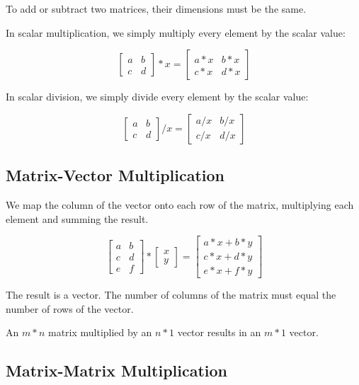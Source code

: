 \documentclass[UTF8]{article}
\begin{document}
To add or subtract two matrices, their dimensions must be the same.

In scalar multiplication, we simply multiply every element by the scalar value:

\[ \begin{bmatrix} a&b\\c&d \end{bmatrix} * x = \begin{bmatrix} a*x&b*x\\c*x&d*x \end{bmatrix}\]

In scalar division, we simply divide every element by the scalar value:

\[ \begin{bmatrix} a&b\\c&d \end{bmatrix} / x = \begin{bmatrix} a/x&b/x\\c/x&d/x \end{bmatrix}\]

\subsection{Matrix-Vector Multiplication}

We map the column of the vector onto each row of the matrix, multiplying each element and summing the result.

\[ \begin{bmatrix} a&b\\c&d\\e&f \end{bmatrix} * \begin{bmatrix} x\\y \end{bmatrix} = \begin{bmatrix} a*x+b*y\\c*x+d*y\\e*x+f*y \end{bmatrix}\]

The result is a vector. The number of columns of the matrix must equal the number of rows of the vector.

An $m * n$ matrix multiplied by an $n * 1$ vector results in an $m * 1$ vector.

\subsection{Matrix-Matrix Multiplication}
\end{document}
